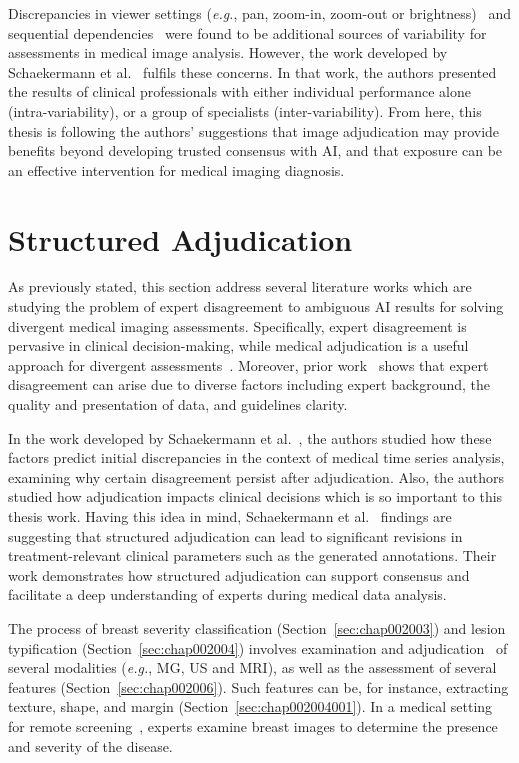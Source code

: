 Discrepancies in viewer settings ({\it e.g.}, pan, zoom-in, zoom-out or brightness)~\cite{10.1145/3359178} and sequential dependencies~\cite{schaekermann2018expert} were found to be additional sources of variability for assessments in medical image analysis.
However, the work developed by Schaekermann et al.~\cite{10.1145/3313831.3376290} fulfils these concerns.
In that work, the authors presented the results of clinical professionals with either individual performance alone (intra-variability), or a group of specialists (inter-variability).
From here, this thesis is following the authors' suggestions that image adjudication may provide benefits beyond developing trusted consensus with \ac{AI}, and that exposure can be an effective intervention for medical imaging diagnosis.

\section{Structured Adjudication}
\label{sec:chap003005}

As previously stated, this section address several literature works which are studying the problem of expert disagreement to ambiguous \ac{AI} results for solving divergent medical imaging assessments.
Specifically, expert disagreement is pervasive in clinical decision-making, while medical adjudication is a useful approach for divergent assessments~\cite{10.1145/3359178, SchaekermannMike2020}.
Moreover, prior work~\cite{Aroyo_Welty_2014} shows that expert disagreement can arise due to diverse factors including expert background, the quality and presentation of data, and guidelines clarity.

In the work developed by Schaekermann et al.~\cite{10.1145/3359178}, the authors studied how these factors predict initial discrepancies in the context of medical time series analysis, examining why certain disagreement persist after adjudication.
Also, the authors studied how adjudication impacts clinical decisions which is so important to this thesis work.
Having this idea in mind, Schaekermann et al.~\cite{10.1145/3359178} findings are suggesting that structured adjudication can lead to significant revisions in treatment-relevant clinical parameters such as the generated annotations.
Their work demonstrates how structured adjudication can support consensus and facilitate a deep understanding of experts during medical data analysis.

The process of breast severity classification (Section~\ref{sec:chap002003}) and lesion typification (Section~\ref{sec:chap002004}) involves examination and adjudication~\cite{DODGION2017196} of several modalities ({\it e.g.}, \ac{MG}, \ac{US} and \ac{MRI}), as well as the assessment of several features (Section~\ref{sec:chap002006}).
Such features can be, for instance, extracting texture, shape, and margin (Section~\ref{sec:chap002004001}).
In a medical setting for remote screening~\cite{10.1200EDBK200141}, experts examine breast images to determine the presence and severity of the disease.

